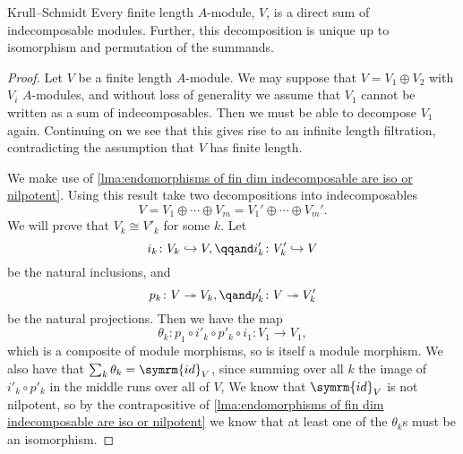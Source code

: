 \documentclass[fleqn]{NotesClass}
\newcommand{\id}{\symrm{id}}
\newcommand{\isomorphic}{\cong}
\begin{document}
    \begin{thm}{Krull--Schmidt}{}
        Every finite length \(A\)-module, \(V\), is a direct sum of indecomposable modules.
        Further, this decomposition is unique up to isomorphism and permutation of the summands.
        \begin{proof}
            Let \(V\) be a finite length \(A\)-module.
            We may suppose that \(V = V_1 \oplus V_2\) with \(V_i\) \(A\)-modules, and without loss of generality we assume that \(V_1\) cannot be written as a sum of indecomposables.
            Then we must be able to decompose \(V_1\) again.
            Continuing on we see that this gives rise to an infinite length filtration, contradicting the assumption that \(V\) has finite length.
            
            We make use of \cref{lma:endomorphisms of fin dim indecomposable are iso or nilpotent}.
            Using this result take two decompositions into indecomposables
            \begin{equation}
                V = V_1 \oplus \dotsb \oplus V_m = V_1' \oplus \dotsb \oplus V_m'.
            \end{equation}
            We will prove that \(V_k \isomorphic V'_k\) for some \(k\).
            Let
            \begin{equation}
                i_k \colon V_k \hookrightarrow V, \qqand i'_k \colon V'_k \hookrightarrow V
            \end{equation}
            be the natural inclusions, and
            \begin{equation}
                p_k \colon V \twoheadrightarrow V_k, \qand p'_k \colon V \twoheadrightarrow V'_k
            \end{equation}
            be the natural projections.
            Then we have the map
            \begin{equation}
                \theta_k \colon p_1 \circ i'_k \circ p'_k \circ i_1 \colon V_1 \to V_1,
            \end{equation}
            which is a composite of module morphisms, so is itself a module morphism.
            We also have that \(\sum_k \theta_k = \id_V\), since summing over all \(k\) the image of \(i'_k \circ p'_k\) in the middle runs over all of \(V\),
            We know that \(\id_V\) is not nilpotent, so by the contrapositive of \cref{lma:endomorphisms of fin dim indecomposable are iso or nilpotent} we know that at least one of the \(\theta_k\)s must be an isomorphism.

\end{proof}
\end{thm}
\end{document}
